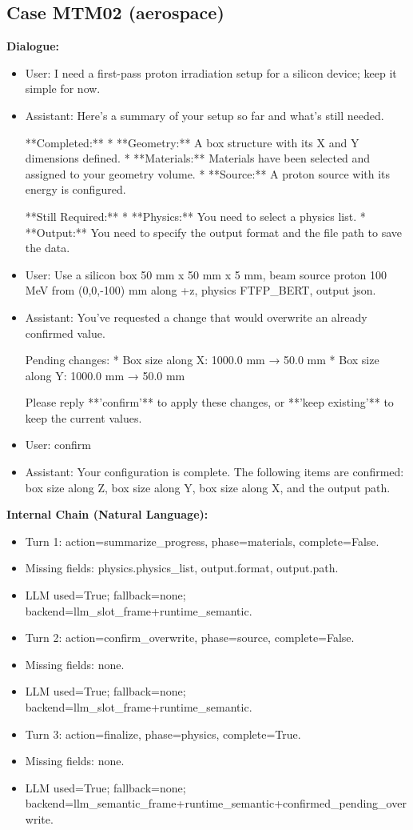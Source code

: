 \documentclass[11pt]{ctexart}
\begin{document}
\subsection{Case MTM02 (aerospace)}
\textbf{Dialogue:}
\begin{itemize}
\item User: I need a first-pass proton irradiation setup for a silicon device; keep it simple for now.
\item Assistant: Here's a summary of your setup so far and what's still needed.

**Completed:**
*   **Geometry:** A box structure with its X and Y dimensions defined.
*   **Materials:** Materials have been selected and assigned to your geometry volume.
*   **Source:** A proton source with its energy is configured.

**Still Required:**
*   **Physics:** You need to select a physics list.
*   **Output:** You need to specify the output format and the file path to save the data.
\item User: Use a silicon box 50 mm x 50 mm x 5 mm, beam source proton 100 MeV from (0,0,-100) mm along +z, physics FTFP\_BERT, output json.
\item Assistant: You've requested a change that would overwrite an already confirmed value.

Pending changes:
*   Box size along X: 1000.0 mm → 50.0 mm
*   Box size along Y: 1000.0 mm → 50.0 mm

Please reply **'confirm'** to apply these changes, or **'keep existing'** to keep the current values.
\item User: confirm
\item Assistant: Your configuration is complete. The following items are confirmed: box size along Z, box size along Y, box size along X, and the output path.
\end{itemize}
\textbf{Internal Chain (Natural Language):}
\begin{itemize}
\item Turn 1: action=summarize\_progress, phase=materials, complete=False.
\item Missing fields: physics.physics\_list, output.format, output.path.
\item LLM used=True; fallback=none; backend=llm\_slot\_frame+runtime\_semantic.
\item Turn 2: action=confirm\_overwrite, phase=source, complete=False.
\item Missing fields: none.
\item LLM used=True; fallback=none; backend=llm\_slot\_frame+runtime\_semantic.
\item Turn 3: action=finalize, phase=physics, complete=True.
\item Missing fields: none.
\item LLM used=True; fallback=none; backend=llm\_semantic\_frame+runtime\_semantic+confirmed\_pending\_overwrite.
\end{itemize}
\end{document}
